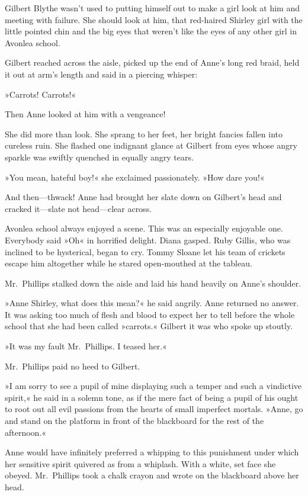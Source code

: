 Gilbert Blythe wasn't used to putting himself out to make a girl look at him and meeting with failure. She should look at him, that red-haired Shirley girl with the little pointed chin and the big eyes that weren't like the eyes of any other girl in Avonlea school.

Gilbert reached across the aisle, picked up the end of Anne's long red braid, held it out at arm's length and said in a piercing whisper:

»Carrots! Carrots!«

Then Anne looked at him with a vengeance!

She did more than look. She sprang to her feet, her bright fancies fallen into cureless ruin. She flashed one indignant glance at Gilbert from eyes whose angry sparkle was swiftly quenched in equally angry tears.

»You mean, hateful boy!« she exclaimed passionately. »How dare you!«

And then—thwack! Anne had brought her slate down on Gilbert's head and cracked it—slate not head—clear across.

Avonlea school always enjoyed a scene. This was an especially enjoyable one. Everybody said »Oh« in horrified delight. Diana gasped. Ruby Gillis, who was inclined to be hysterical, began to cry. Tommy Sloane let his team of crickets escape him altogether while he stared open-mouthed at the tableau.

Mr.~Phillips stalked down the aisle and laid his hand heavily on Anne's shoulder.

»Anne Shirley, what does this mean?« he said angrily. Anne returned no answer. It was asking too much of flesh and blood to expect her to tell before the whole school that she had been called »carrots.« Gilbert it was who spoke up stoutly.

»It was my fault Mr.~Phillips. I teased her.«

Mr.~Phillips paid no heed to Gilbert.

»I am sorry to see a pupil of mine displaying such a temper and such a vindictive spirit,« he said in a solemn tone, as if the mere fact of being a pupil of his ought to root out all evil passions from the hearts of small imperfect mortals. »Anne, go and stand on the platform in front of the blackboard for the rest of the afternoon.«

Anne would have infinitely preferred a whipping to this punishment under which her sensitive spirit quivered as from a whiplash. With a white, set face she obeyed. Mr.~Phillips took a chalk crayon and wrote on the blackboard above her head.

